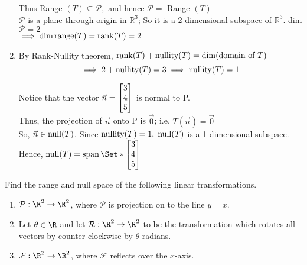 \begin{exercises}
\begin{problist}
\begin{solution}
\begin{enumerate}
                Thus Range \((T) \subseteq \mathcal{P},\) and hence \(\mathcal{P}=\) Range \((T)\)\\
                
                $\mathcal{P}$ is a plane through origin in \(\mathbb{R}^{3}\); So it is a 2 dimensional
                subspace of \(\mathbb{R}^{3}\). dim \(\mathcal{P}=2\)\\
                
                $\implies \operatorname{dim} \operatorname{range}(T) = \operatorname{rank}(T)=2$
                
                \item By Rank-Nullity theorem, $\operatorname{rank}(T)+\operatorname{nullity}(T) = \operatorname{dim}(\text{domain of } T)$\\
                \[\implies 2+\operatorname{nullity}(T)=3 \implies \operatorname{nullity}(T)=1\]
                
                Notice that the vector $\vec n = \mat{3\\4\\5}$ is normal to P.\\
                
                Thus, the projection of $\vec n$ onto P is $\vec 0$; i.e. $T(\vec n) =\vec 0$\\
                
                So, $\vec n\in \operatorname{null}(T)$. Since $\operatorname{nullity}(T)=1, \;\operatorname{null}(T)$ is a 1 dimensional subspace.\\
                
                Hence, $\Null(T) = \Span\Set*{\mat{3\\4\\5}}$
            \end{enumerate}
        \end{solution}

		\prob Find the range and null space of the following linear
		transformations.
		\begin{enumerate}
			\item $\mathcal P:\R^{2}\to\R^{2}$, where
				$\mathcal P$ is projection on to the line
				$y=x$.

			\item Let $\theta\in \R$ and let $\mathcal R:\R^{2}\to\R^{2}$
				to be the transformation which rotates all vectors
				by counter-clockwise by $\theta$ radians.

			\item $\mathcal F:\R^{2}\to\R^{2}$, where
				$\mathcal F$ reflects over the $x$-axis.


\end{enumerate}
\end{problist}
\end{exercises}
